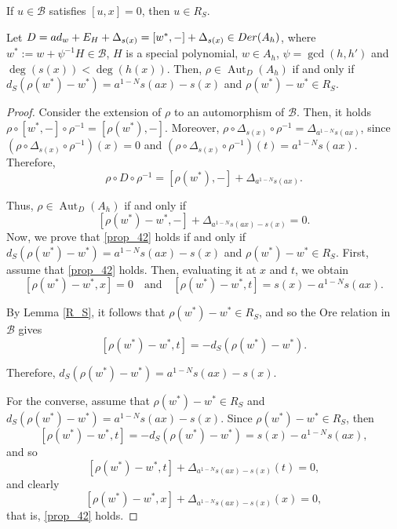 \documentclass[10pt,a4paper]{amsart}
\DeclareMathOperator{\Aut}{Aut}
\newcommand{\der}{{\rm Der}}
\begin{document}
\begin{lemma}\label{R_S} If $u \in \mathcal B$ satisfies $[u,x]=0$, then $u \in R_S$.
\end{lemma}

\begin{proposition} \label{classificacao}
Let $D=ad_w+E_H+\Delta_{s(x)}=[w^\ast,-]+\Delta_{s(x)} \in \der(A_h)$, where $w^\ast:=w+\psi^{-1}H \in \mathcal B$, $H$ is a special polynomial, $w\in A_h$, $\psi=\gcd(h,h')$ and $\deg (s(x)) < \deg (h(x))$.
Then, $\rho \in \Aut_D(A_h)$ if and only if $d_S(\rho(w^\ast)-w^\ast)=a^{1-N}s(ax)-s(x)$ and $\rho(w^\ast)-w^\ast \in R_S$.
\end{proposition}

\begin{proof}
Consider the extension of $\rho$ to an automorphism of $\mathcal B$.
Then, it holds $\rho \circ[w^\ast,-] \circ \rho^{-1}=[\rho(w^\ast),-]$. 
Moreover, $\rho\circ\Delta_{s(x)}\circ\rho^{-1}
=\Delta_{a^{1-N}s(ax)}$, since $(\rho\circ\Delta_{s(x)}\circ\rho^{-1})(x)=0$ and $(\rho\circ\Delta_{s(x)}\circ\rho^{-1})(t)=a^{1-N}s(ax)$. Therefore,
\[
\rho\circ D\circ\rho^{-1}
=
[\rho(w^\ast),-]+\Delta_{a^{1-N}s(ax)}.
\]

Thus, $\rho\in\Aut_D(A_h)$ if and only if
\begin{equation}\label{prop_42}
[\rho(w^\ast)-w^\ast,-]+\Delta_{a^{1-N}s(ax)-s(x)}=0.
\end{equation}
Now, we prove that \eqref{prop_42} holds if and only if $d_S(\rho(w^\ast)-w^\ast)=a^{1-N}s(ax)-s(x)$ and $\rho(w^\ast)-w^\ast \in R_S$.
First, assume that \eqref{prop_42} holds.
Then, evaluating it at $x$ and $t$, we obtain
\[
[\rho(w^\ast)-w^\ast,x]=0 \quad \text{and} \quad [\rho(w^\ast)-w^\ast,t]=s(x)-a^{1-N}s(ax).
\]

By Lemma \ref{R_S}, it follows that $\rho(w^\ast)-w^\ast\in R_S$, and so the Ore relation in $\mathcal B$ gives
\[
[\rho(w^\ast)-w^\ast,t]
=
-d_S(\rho(w^\ast)-w^\ast).
\]

Therefore, $d_S(\rho(w^\ast)-w^\ast)=a^{1-N}s(ax)-s(x)$.

 For the converse, assume that $\rho(w^\ast)-w^\ast \in R_S$ and $d_S(\rho(w^\ast)-w^\ast)=a^{1-N}s(ax)-s(x)$.
Since $\rho(w^\ast)-w^\ast \in R_S$, then 
$$[\rho(w^\ast)-w^\ast,t]
=
-d_S(\rho(w^\ast)-w^\ast) = s(x) - a^{1-N}s(ax),$$
and so 
$$ [\rho(w^\ast)-w^\ast,t]+\Delta_{a^{1-N}s(ax)-s(x)}(t)=0,$$
and clearly 
$$ [\rho(w^\ast)-w^\ast,x]+\Delta_{a^{1-N}s(ax)-s(x)}(x)=0,$$
that is, \eqref{prop_42} holds.
\end{proof}
\end{document}
